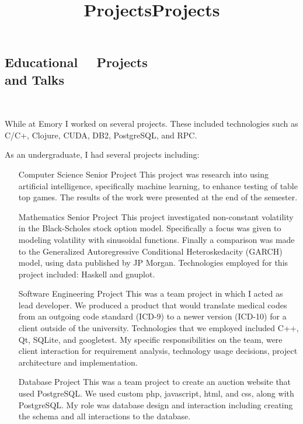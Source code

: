 \documentclass[margintitle,line]{res}
\begin{document}
\begin{resume}
\section{Educational \ \ Projects \\ and Talks}
\ \\

\title{Projects}
\begin{position}
While at Emory I worked on several projects. These included technologies such as C/C+, Clojure, CUDA, DB2, PostgreSQL, and RPC.
\end{position}

\title{Projects}
\begin{position}
As an undergraduate, I had several projects including:
\begin{itemize}
\item [Computer Science Senior Project] This project was research into using artificial intelligence, specifically machine learning, to enhance testing of table top games. The results of the work were presented at the end of the semester.

\item[Mathematics Senior Project] This project investigated non-constant volatility in the Black-Scholes stock option model. Specifically a focus was given to modeling volatility with sinusoidal functions. Finally a comparison was made to the Generalized Autoregressive Conditional Heteroskedacity (GARCH) model, using data published by JP Morgan. Technologies employed for this project included: Haskell and gnuplot.

\item[Software Engineering Project] This was a team project in which I acted as lead developer. We produced a product that would translate medical codes from an outgoing code standard (ICD-9) to a newer version (ICD-10) for a client outside of the university. Technologies that we employed included C++, Qt, SQLite, and googletest. My specific responsibilities on the team, were client interaction for requirement analysis, technology usage decisions, project architecture and implementation.

\item[Database Project] This was a team project to create an auction website that used PostgreSQL. We used custom php, javascript, html, and css, along with PostgreSQL. My role was database design and interaction including creating the schema and all interactions to the database.


\end{itemize}
\end{position}
\end{resume}
\end{document}
